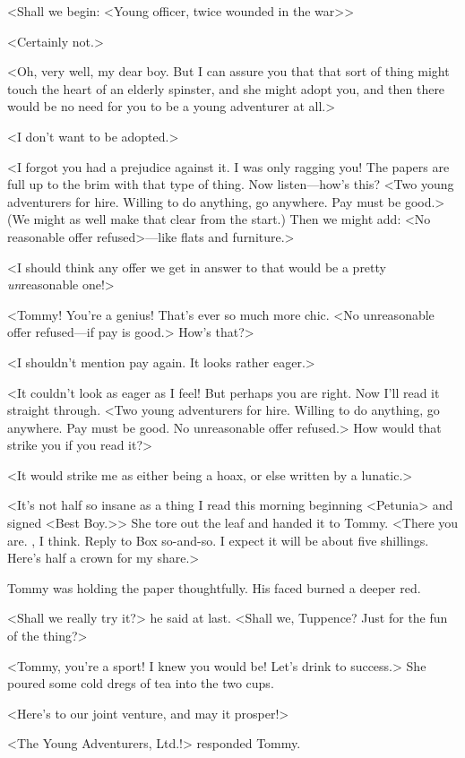 <Shall we begin: <Young officer, twice wounded in the war\longdash>>

<Certainly not.>

<Oh, very well, my dear boy. But I can assure you that that sort of thing might touch the heart of an elderly spinster, and she might adopt you, and then there would be no need for you to be a young adventurer at all.>

<I don't want to be adopted.>

<I forgot you had a prejudice against it. I was only ragging you! The papers are full up to the brim with that type of thing. Now listen—how's this? <Two young adventurers for hire. Willing to do anything, go anywhere. Pay must be good.> (We might as well make that clear from the start.) Then we might add: <No reasonable offer refused>—like flats and furniture.>

<I should think any offer we get in answer to that would be a pretty \emph{un}reasonable one!>

<Tommy! You're a genius! That's ever so much more chic. <No unreasonable offer refused—if pay is good.> How's that?>

<I shouldn't mention pay again. It looks rather eager.>

<It couldn't look as eager as I feel! But perhaps you are right. Now I'll read it straight through. <Two young adventurers for hire. Willing to do anything, go anywhere. Pay must be good. No unreasonable offer refused.> How would that strike you if you read it?>

<It would strike me as either being a hoax, or else written by a lunatic.>

<It's not half so insane as a thing I read this morning beginning <Petunia> and signed <Best Boy.>> She tore out the leaf and handed it to Tommy. <There you are. , I think. Reply to Box so-and-so. I expect it will be about five shillings. Here's half a crown for my share.>

Tommy was holding the paper thoughtfully. His faced burned a deeper red.

<Shall we really try it?> he said at last. <Shall we, Tuppence? Just for the fun of the thing?>

<Tommy, you're a sport! I knew you would be! Let's drink to success.> She poured some cold dregs of tea into the two cups.

<Here's to our joint venture, and may it prosper!>

<The Young Adventurers, Ltd.!> responded Tommy.

